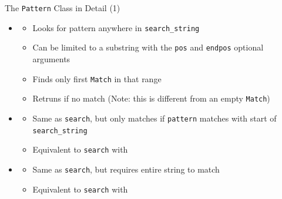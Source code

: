 \begin{frame}{The \texttt{Pattern} Class in Detail (1)}
%
\begin{itemize}
\item {}
	\begin{itemize}
	\item Looks for pattern anywhere in \texttt{search\_string}
	\item Can be limited to a substring with the \texttt{pos} and \texttt{endpos} optional arguments
	\item Finds only first \texttt{Match} in that range
	\item Retruns  if no match (Note: this is different from an empty \texttt{Match})
	\end{itemize}
\pause
\item {}
	\begin{itemize}
	\item Same as \texttt{search}, but only matches if \texttt{pattern} matches with start of \texttt{search\_string}
	\item Equivalent to \texttt{search} with 
	\end{itemize}
\pause
\item {}
	\begin{itemize}
	\item Same as \texttt{search}, but requires entire string to match
	\item Equivalent to \texttt{search} with 
	\end{itemize}
\end{itemize}
%
\end{frame}


